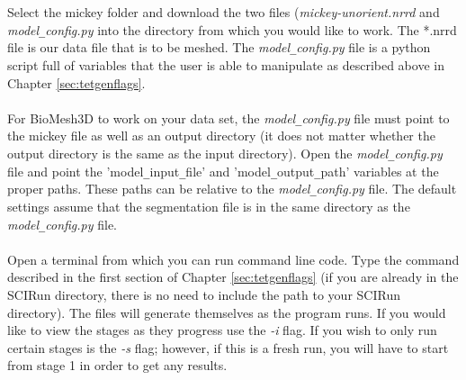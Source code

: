 \documentclass[fleqn,12pt,openany]{book}
\begin{document}
Select the mickey folder and download the two files 
(\emph{mickey-unorient.nrrd} and \emph{model}\verb+_+\emph{config.py} into the 
directory from which you would like to work.  The *.nrrd file is our data file 
that is to be meshed.  The \emph{model}\verb+_+\emph{config.py} file is a 
python script full of variables that the user is able to manipulate as described 
above in Chapter \ref{sec:tetgenflags}.

\paragraph{}
For BioMesh3D to work on your data set, the \emph{model}\verb+_+\emph{config.py} 
file must point to the mickey file as well as an output directory (it does not 
matter whether the output directory is the same as the input directory).  Open 
the \emph{model}\verb+_+\emph{config.py} file and point the 
'model\verb+_+input\verb+_+file' and 'model\verb+_+output\verb+_+path' 
variables at the proper paths. These paths can be relative to the \emph{model}\verb+_+\emph{config.py} file.
The default settings assume that the segmentation file is in the same directory
as the \emph{model}\verb+_+\emph{config.py} file.


\paragraph{}
Open a terminal from which you can run command line code.  Type the command 
described in the first section of Chapter \ref{sec:tetgenflags} (if you are 
already in the SCIRun directory, there is no need to include the path to your 
SCIRun directory).  The files will generate themselves as the program runs.  
If you would like to view the stages as they progress use the \emph{-i} flag.  
If you wish to only run certain stages is the \emph{-s} flag; however, if this 
is a fresh run, you will have to start from stage 1 in order to get any results.
\end{document}
